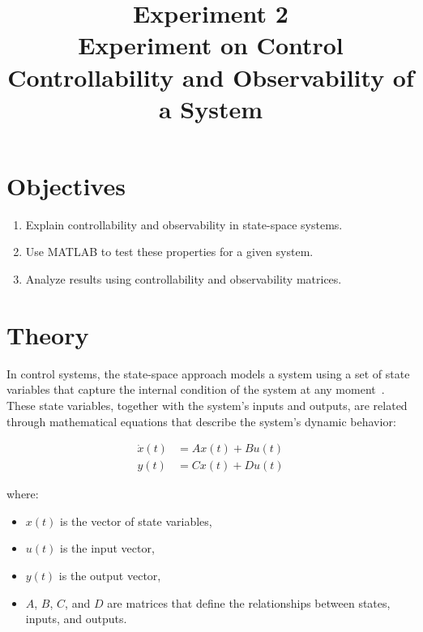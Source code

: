 \documentclass[12pt]{article}
\title{Experiment 2\\
\textbf{Experiment on Control Controllability and Observability of a System}}
\author{}
\date{}
\begin{document}


\pagebreak

\tableofcontents

\pagebreak
{}
\maketitle

\vspace{-5em}

\section*{Objectives}
\begin{enumerate}
  \item Explain controllability and observability in state-space systems.
  \item Use MATLAB to test these properties for a given system.
  \item Analyze results using controllability and observability matrices.
\end{enumerate}

\section*{Theory}
In control systems, the state-space approach models a system using a set of state variables that capture the internal condition of the system at any moment~\cite{Ogata, Nise}. These state variables, together with the system's inputs and outputs, are related through mathematical equations that describe the system's dynamic behavior:

\begin{align*}
  \dot{x}(t) & = A x(t) + B u(t) \\
  y(t)       & = C x(t) + D u(t)
\end{align*}

where:
\begin{itemize}
  \item $x(t)$ is the vector of state variables,
  \item $u(t)$ is the input vector,
  \item $y(t)$ is the output vector,
  \item $A$, $B$, $C$, and $D$ are matrices that define the relationships between states, inputs, and outputs.
\end{itemize}
\end{document}
